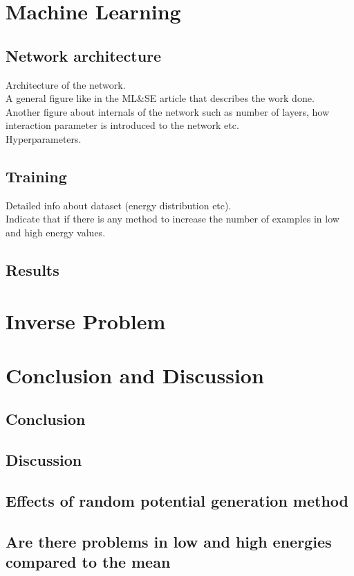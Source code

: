 \documentclass[a4paper,times,12pt]{article}
\begin{document}
\section{Machine Learning}
\subsection{Network architecture}
\noindent Architecture of the network.\\
    A general figure like in the ML\&SE article that describes the work done.\\
    Another figure about internals of the network such as number of layers, how interaction parameter is introduced to the network etc.\\
    Hyperparameters.\\
\subsection{Training}
\noindent    Detailed info about dataset (energy distribution etc).\\
    Indicate that if there is any method to increase the number of examples in low and high energy values.

\subsection{Results}

\section{Inverse Problem}

\clearpage
\section{Conclusion and Discussion}
\subsection{Conclusion}
\subsection{Discussion}
\subsection{Effects of random potential generation method}
\subsection{Are there problems in low and high energies compared to the mean}
\end{document}

